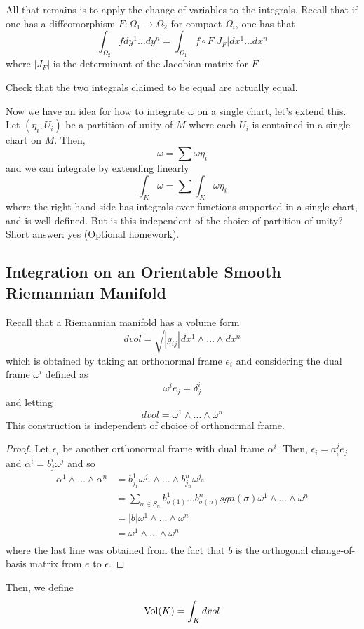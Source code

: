 \documentclass[../main.tex]{subfiles}
\begin{document}
All that remains is to apply the change of variables to the integrals. Recall
that if one has a diffeomorphism $F:\Omega_1\to\Omega_2$ for compact $\Omega_i$,
one has that
\[
    \int_{\Omega_2}fdy^1\ldots dy^n = \int_{\Omega_1}f\circ F|J_F|dx^1\ldots
    dx^n
\]
where $|J_F|$ is the determinant of the Jacobian matrix for $F$.
\begin{hw}
    Check that the two integrals claimed to be equal are actually equal.
\end{hw}

Now we have an idea for how to integrate $\omega$ on a single chart, let's
extend this. Let $(\eta_i,U_i)$ be a partition of unity of $M$ where each $U_i$
is contained in a single chart on $M$. Then,
\[
    \omega = \sum\omega\eta_i
\]
and we can integrate by extending linearly
\[
    \int_K\omega = \sum\int_{K}\omega\eta_i
\]
where the right hand side has integrals over functions supported in a single
chart, and is well-defined. But is this independent of the choice of partition
of unity? Short answer: yes (Optional homework).

\subsection{Integration on an Orientable Smooth Riemannian Manifold}
Recall that a Riemannian manifold has a volume form
\[
    dvol = \sqrt{|g_{ij}|}dx^1\wedge\ldots\wedge dx^n
\]
which is obtained by taking an orthonormal frame $e_i$ and considering the dual
frame $\omega^i$ defined as
\[
    \omega^ie_j = \delta^i_j
\]
and letting
\[
    dvol = \omega^1\wedge\ldots\wedge\omega^n
\]
This construction is independent of choice of orthonormal frame.
\begin{proof}
Let $\epsilon_i$ be another orthonormal frame with dual frame $\alpha^i$. Then,
$\epsilon_i = a^j_ie_j$ and $\alpha^i = b^i_j\omega^j$ and so
    \[
        \begin{aligned}
            \alpha^1\wedge\ldots\wedge\alpha^n &=
            b^1_{j_1}\omega^{j_1}\wedge\ldots\wedge b^n_{j_n}\omega^{j_n}\\
            &= \sum_{\sigma\in S_n} b^1_{\sigma(1)}\ldots
            b^n_{\sigma(n)}sgn(\sigma)\omega^1\wedge\ldots\wedge\omega^n\\
            &= |b|\omega^1\wedge\ldots\wedge\omega^n\\
            &= \omega^1\wedge\ldots\wedge\omega^n\\
        \end{aligned}
    \]
    where the last line was obtained from the fact that $b$ is the orthogonal
    change-of-basis matrix from $e$ to $\epsilon$.
\end{proof}

Then, we define
\[
    \textrm{Vol}(K) = \int_Kdvol
\]
\end{document}
